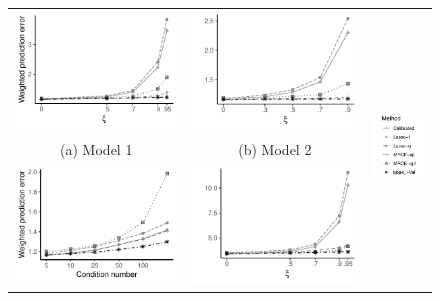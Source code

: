 \documentclass[12pt]{article}
\begin{document}
\begin{figure}[t!]
\begin{tabular}{ccc}
\includegraphics[width=6.9cm]{Plots/NormalHet_AR1_PredErr_April.pdf} &   \includegraphics[width=6.9cm]{Plots/NormalHet_Const_PredErr_April.pdf} & \multirow{4}{*}{\includegraphics[width=2.5cm]{Plots/Vert_Legend.pdf}} \\
(a) Model 1  & (b) Model 2  & \\[6pt]
 \includegraphics[width=6.9cm]{Plots/NormalHet_Dense_PredErr_April.pdf} &   \includegraphics[width=7.1cm]{Plots/THet_AR1_PredErr_April.pdf} &  \\

\end{tabular}
\end{figure}
\end{document}
